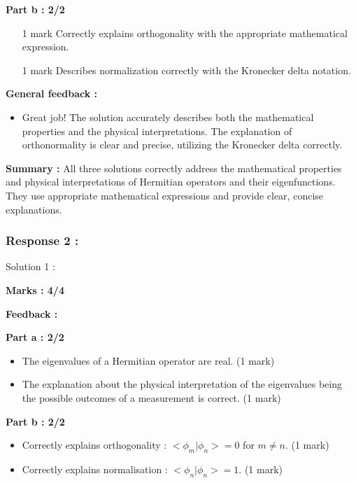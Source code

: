 \documentclass[a4paper,11pt]{article}
\begin{document}
\textbf{Part b : 2/2}

\begin{itemize}
    \item [1 mark] Correctly explains orthogonality with the appropriate mathematical expression.
    \item [1 mark] Describes normalization correctly with the Kronecker delta notation.
\end{itemize}


\textbf{General feedback :}

\begin{itemize}
    \item Great job! The solution accurately describes both the mathematical properties and the physical interpretations. The explanation of orthonormality is clear and precise, utilizing the Kronecker delta correctly.
\end{itemize}

\textbf{Summary :}
All three solutions correctly address the mathematical properties and physical interpretations of Hermitian operators and their eigenfunctions. They use appropriate mathematical expressions and provide clear, concise explanations.


\subsubsection*{Response 2 :}

Solution 1 : 

\textbf{Marks : 4/4}

\textbf{Feedback : }

\textbf{Part a : 2/2}

\begin{itemize}
    \item The eigenvalues of a Hermitian operator are real. (1 mark)
    \item The explanation about the physical interpretation of the eigenvalues being the possible outcomes of a measurement is correct. (1 mark)
\end{itemize}


\textbf{Part b : 2/2}

\begin{itemize}
    \item Correctly explains orthogonality : $<\phi_m|\phi_n> = 0$ for $m \neq n$. (1 mark)
    \item Correctly explains normalisation : $<\phi_n|\phi_n> = 1$. (1 mark)
\end{itemize}
\end{document}
